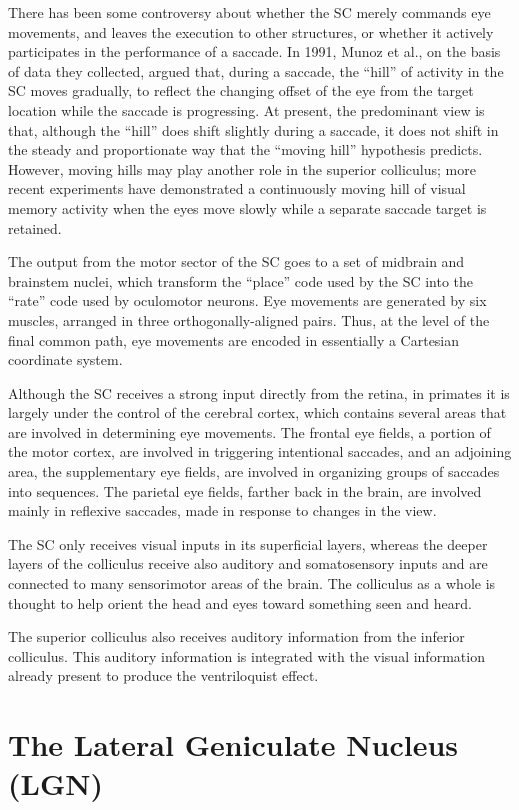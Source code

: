 There has been some controversy about whether the SC merely commands eye movements, and leaves the execution to other structures, or whether it actively participates in the performance of a saccade. In 1991, Munoz et al., on the basis of data they collected, argued that, during a saccade, the ``hill'' of activity in the SC moves gradually, to reflect the changing offset of the eye from the target location while the saccade is progressing. At present, the predominant view is that, although the ``hill'' does shift slightly during a saccade, it does not shift in the steady and proportionate way that the ``moving hill'' hypothesis predicts. However, moving hills may play another role in the superior colliculus; more recent experiments have demonstrated a continuously moving hill of visual memory activity when the eyes move slowly while a separate saccade target is retained.

The output from the motor sector of the SC goes to a set of midbrain and brainstem nuclei, which transform the ``place'' code used by the SC into the ``rate'' code used by oculomotor neurons. Eye movements are generated by six muscles, arranged in three orthogonally-aligned pairs. Thus, at the level of the final common path, eye movements are encoded in essentially a Cartesian coordinate system.

Although the SC receives a strong input directly from the retina, in primates it is largely under the control of the cerebral cortex, which contains several areas that are involved in determining eye movements. The frontal eye fields, a portion of the motor cortex, are involved in triggering intentional saccades, and an adjoining area, the supplementary eye fields, are involved in organizing groups of saccades into sequences. The parietal eye fields, farther back in the brain, are involved mainly in reflexive saccades, made in response to changes in the view.

The SC only receives visual inputs in its superficial layers, whereas the deeper layers of the colliculus receive also auditory and somatosensory inputs and are connected to many sensorimotor areas of the brain. The colliculus as a whole is thought to help orient the head and eyes toward something seen and heard.

The superior colliculus also receives auditory information from the inferior colliculus. This auditory information is integrated with the visual information already present to produce the ventriloquist effect.

\hypertarget{the-lateral-geniculate-nucleus-lgn}{%
\section{The Lateral Geniculate Nucleus (LGN)}\label{the-lateral-geniculate-nucleus-lgn}}

